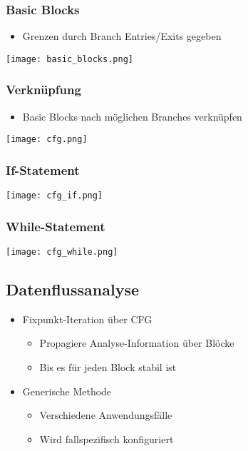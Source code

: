 \subsubsection{Basic Blocks}
\begin{itemize}
    \item Grenzen durch Branch Entries/Exits gegeben
\end{itemize}
\texttt{[image: basic\_blocks.png]}

\subsubsection{Verknüpfung}
\begin{itemize}
    \item Basic Blocks nach möglichen Branches verknüpfen
\end{itemize}
\texttt{[image: cfg.png]}

\subsubsection{If-Statement}
\texttt{[image: cfg\_if.png]}

\subsubsection{While-Statement}
\texttt{[image: cfg\_while.png]}

\subsection{Datenflussanalyse}
\begin{itemize}
    \item Fixpunkt-Iteration über CFG
    \begin{itemize}
        \item Propagiere Analyse-Information über Blöcke
        \item Bis es für jeden Block stabil ist
    \end{itemize}
    \item Generische Methode
    \begin{itemize}
        \item Verschiedene Anwendungsfälle
        \item Wird fallspezifisch konfiguriert
    \end{itemize}
\end{itemize}

